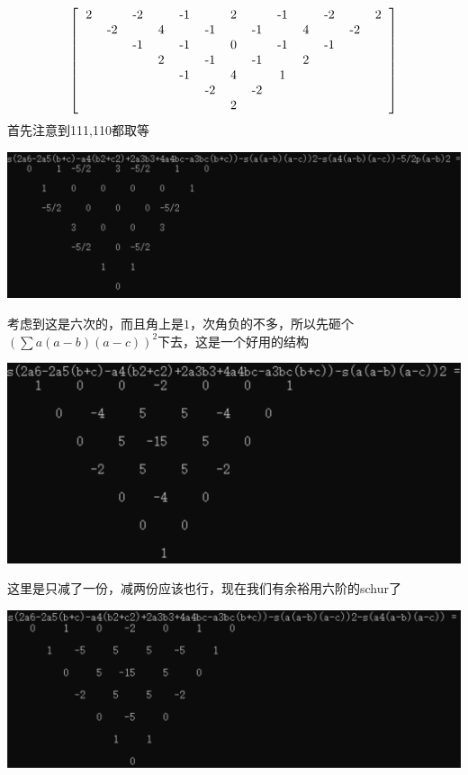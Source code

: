 \documentclass[UTF8]{ctexart}
\begin{document}
\subsection{}
\renewcommand*{\arraystretch}{1.732}\[
\left[\begin{matrix}
	\begin{tabular}{ccccccccccccc}
		2& &-2& &-1& &2& &-1& &-2& &2\\
		&-2& &4& &-1& &-1& &4& &-2&\\
		& &-1& &-1& &0& &-1& &-1& &\\
		& & &2& &-1& &-1& &2& & &\\
		& & & &-1& &4& &1& & & &\\
		& & & & &-2& &-2& & & & &\\
		& & & & & &2& & & & & &\\
	\end{tabular}
\end{matrix}\right]
\] 
首先注意到111,110都取等
\begin{center}
	\includegraphics[width=0.7\linewidth]{a10}
\end{center}
考虑到这是六次的，而且角上是$ 1 $，次角负的不多，所以先砸个$ (\displaystyle \sum a(a-b)(a-c))^{2} $下去，这是一个好用的结构
\begin{center}
	\includegraphics[width=0.7\linewidth]{a11}
\end{center}
这里是只减了一份，减两份应该也行，现在我们有余裕用六阶的schur了
\begin{center}
	\includegraphics[width=0.7\linewidth]{a12}
\end{center}
\end{document}
